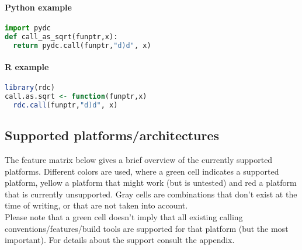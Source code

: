 \paragraph{Python example}

\begin{lstlisting}[language=python,caption=Dyncall Python bindings example]
import pydc
def call_as_sqrt(funptr,x):
  return pydc.call(funptr,"d)d", x)
\end{lstlisting}


\paragraph{R example}

\begin{lstlisting}[language=R,caption=Dyncall R bindings example]
library(rdc)
call.as.sqrt <- function(funptr,x)
  rdc.call(funptr,"d)d", x)
\end{lstlisting}


\pagebreak

\subsection{Supported platforms/architectures}

The feature matrix below gives a brief overview of the currently supported
platforms. Different colors are used, where a green cell indicates a supported
platform, yellow a platform that might work (but is untested) and red a platform
that is currently unsupported. Gray cells are combinations that don't exist
at the time of writing, or that are not taken into account.\\
Please note that a green cell doesn't imply that all existing calling
conventions/features/build tools are supported for that platform (but the most important).
For details about the support consult the appendix.

